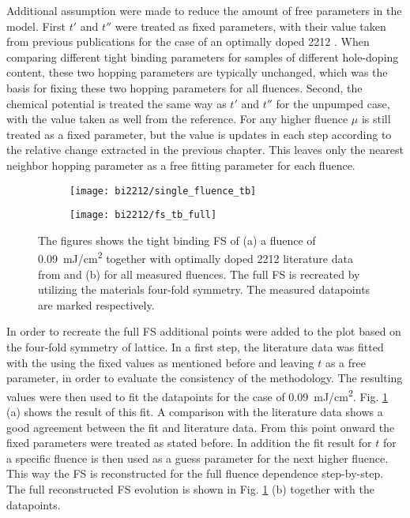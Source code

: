 Additional assumption were made to reduce the amount of free parameters in the model.
First $t'$ and $t''$ were treated as fixed parameters, with their value taken from previous publications for the case of an optimally doped 2212 \cite{kondo_hole-concentration_2004}.
When comparing different tight binding parameters for samples of different hole-doping content, these two hopping parameters are typically unchanged, which was the basis for fixing these two hopping parameters for all fluences.
Second, the chemical potential is treated the same way as $t'$ and $t''$ for the unpumped case, with the value taken as well from the reference.
For any higher fluence $\mu$ is still treated as a fixed parameter, but the value is updates in each step according to the relative change extracted in the previous chapter.
This leaves only the nearest neighbor hopping parameter as a free fitting parameter for each fluence.

\begin{figure}[b!]
	\centering
	\begin{subfigure}[t!]{0.33\textwidth}
		\texttt{[image: bi2212/single\_fluence\_tb]}
		\caption{}
	\end{subfigure}
	\begin{subfigure}[t!]{0.33\textwidth}
		\texttt{[image: bi2212/fs\_tb\_full]}
		\caption{}
	\end{subfigure}
	\caption{The figures shows the tight binding FS of (a) a fluence of \qty{0.09}{\milli\joule/\centi\meter\squared} together with optimally doped 2212 literature data from \cite{kondo_hole-concentration_2004} and (b) for all measured fluences. The full FS is recreated by utilizing the materials four-fold symmetry. The measured datapoints are marked respectively.}
	\label{fig:fs_tb}
\end{figure}

In order to recreate the full FS additional points were added to the plot based on the four-fold symmetry of lattice.
In a first step, the literature data was fitted with the using the fixed values as mentioned before and leaving $t$ as a free parameter, in order to evaluate the consistency of the methodology.
The resulting values were then used to fit the datapoints for the case of \qty{0.09}{\milli\joule/\centi\meter\squared}.
Fig. \ref{fig:fs_tb} (a) shows the result of this fit.
A comparison with the literature data shows a good agreement between the fit and literature data.
From this point onward the fixed parameters were treated as stated before.
In addition the fit result for $t$ for a specific fluence is then used as a guess parameter for the next higher fluence.
This way the FS is reconstructed for the full fluence dependence step-by-step.
The full reconstructed FS evolution is shown in Fig. \ref{fig:fs_tb} (b) together with the datapoints.


